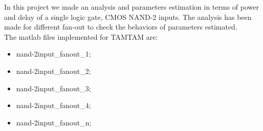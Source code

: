 In this project we made an analysis and parameters estimation in terms of power and delay of a single logic gate, CMOS NAND-2 inputs. The analysis has been made for different fan-out to check the behaviors of parameters estimated. \\The matlab files implemented for TAMTAM are: 
\begin{itemize}
\item nand-2input\_fanout\_1;
\item nand-2input\_fanout\_2;
\item nand-2input\_fanout\_3;
\item nand-2input\_fanout\_4;
\item nand-2input\_fanout\_n;
\end{itemize}
 